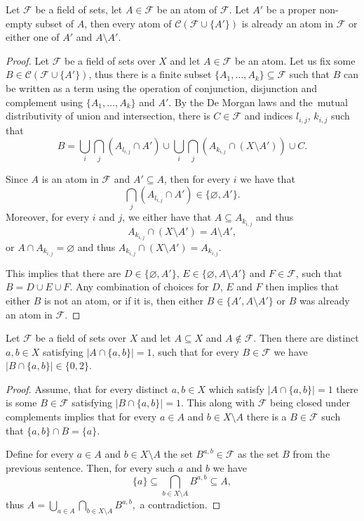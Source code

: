 \documentclass{lmcs}
\newcommand{\abs}[1]{\lvert #1\rvert}
\newcommand{\F}{\mathcal{F}}
\newcommand{\C}{\mathcal{C}}
\begin{document}
\begin{lem}\label{lemmdiv}
    Let $\F$ be a field of sets, let $A\in \F$ be an atom of $\F$. Let $A'$ be a proper non-empty subset of $A$, then every atom of $\C(\F\cup \{A'\})$ is already an atom in $\F$ or either one of $A'$ and $A\setminus A'$.
\end{lem}
\begin{proof}
    Let $\F$ be a field of sets over $X$ and let $A\in \F$ be an atom. Let us fix some $B\in \C(\F \cup \{A'\})$, thus there is a finite subset $\{A_1,\dots,A_k\}\subseteq \F$ such that $B$ can be written as a term using the operation of conjunction, disjunction and complement using $\{A_1,\dots,A_k\}$ and $A'$. By the De Morgan laws and the~mutual distributivity of union and intersection, there is $C\in \F$ and indices $l_{i,j}$, $k_{i,j}$ such that
    \[B = \bigcup_i \bigcap_j (A_{l_{i,j}}\cap A') \cup \bigcup_i \bigcap_j (A_{k_{i,j}}\cap (X \setminus A')) \cup C.\]

    Since $A$ is an atom in $\F$ and $A'\subseteq A$, then for every $i$ we have that \[\bigcap_j (A_{l_{i,j}}\cap A')\in \{\varnothing, A'\}.\]
    Moreover, for every $i$ and $j$, we either have that $A \subseteq A_{k_{i,j}}$ and thus \[A_{k_{i,j}}\cap (X\setminus A') = A\setminus A',\]
    or $A\cap A_{k_{i,j}} = \varnothing$ and thus $A_{k_{i,j}}\cap (X\setminus A')=A_{k_{i,j}}$.

    This implies that there are $D\in\{\varnothing, A'\}$, $E\in \{\varnothing,A\setminus A'\}$ and $F\in \F$, such that $B = D \cup E \cup F$. Any combination of choices for $D$, $E$ and $F$ then implies that either $B$ is not an atom, or if it is, then either $B\in\{A',A\setminus A'\}$ or $B$ was already an atom in $\F$.
\end{proof}

\begin{lem}\label{lemmbreaks}
    Let $\F$ be a field of sets over $X$ and let $A\subseteq X$ and $A\not \in \F$. Then there are distinct $a,b\in X$ satisfying $\abs{A\cap \{a,b\}}=1$, such that for every $B \in \F$ we have $\abs{B\cap \{a,b\}} \in \{0,2\}$.
\end{lem}
\begin{proof}
    Assume, that for every distinct $a,b\in X$ which satisfy $\abs{A \cap \{a,b\}} = 1$ there is some $B\in \F$ satisfying $\abs{B\cap \{a,b\}} = 1$. This along with $\F$ being closed under complements implies that for every $a\in A$ and $b\in X\setminus A$ there is a $B\in \F$ such that $\{a,b\} \cap B = \{a\}$.

    Define for every $a\in A$ and $b\in X\setminus A$ the set $B^{a,b}\in \F$ as the set $B$ from the previous sentence. Then, for every such $a$ and $b$ we have
    \[\{a\}\subseteq \bigcap_{b\in X\setminus A} B^{a,b} \subseteq A,\]
    thus $A = \bigcup_{a\in A} \bigcap_{b\in X\setminus A} B^{a,b},$ a contradiction.
\end{proof}
\end{document}
